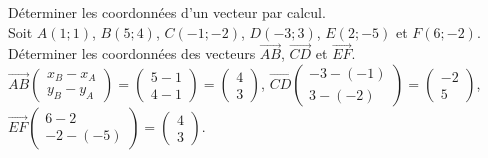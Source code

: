 \begin{Méthode}Déterminer les coordonnées d'un vecteur par calcul. \\
Soit $A(1;1)$, $B(5;4)$, $C(-1;-2)$, $D(-3;3)$, $E(2;-5)$ et $F(6;-2)$.\\
Déterminer les coordonnées des vecteurs $\overrightarrow{AB}$, $\overrightarrow{CD}$ et $\overrightarrow{EF}$.\\
$\overrightarrow{AB}\begin{pmatrix} 
x_B-x_A \\ 
y_B-y_A
 \end{pmatrix}=\begin{pmatrix} 
5-1 \\ 
4-1
 \end{pmatrix}=\begin{pmatrix} 
4 \\
3
 \end{pmatrix}$, 
$\overrightarrow{CD}\begin{pmatrix} 
-3-(-1) \\ 
3-(-2)
 \end{pmatrix}=\begin{pmatrix} 
-2 \\
5
 \end{pmatrix}$, $\overrightarrow{EF}\begin{pmatrix} 
6-2 \\ 
-2-(-5)
 \end{pmatrix}=\begin{pmatrix} 
4 \\
3
 \end{pmatrix}$.



\end{Méthode}


